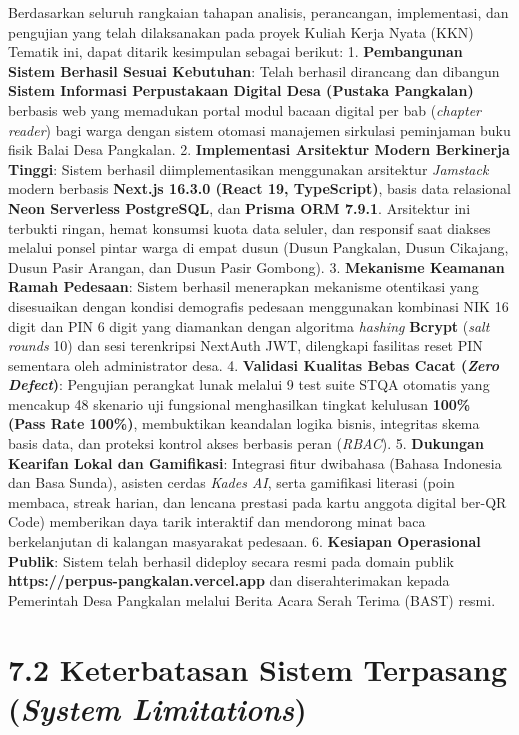 \documentclass[
  indonesian,
  12pt,
]{report}
\begin{document}
Berdasarkan seluruh rangkaian tahapan analisis, perancangan,
implementasi, dan pengujian yang telah dilaksanakan pada proyek Kuliah
Kerja Nyata (KKN) Tematik ini, dapat ditarik kesimpulan sebagai berikut:
1. \textbf{Pembangunan Sistem Berhasil Sesuai Kebutuhan}: Telah berhasil
dirancang dan dibangun \textbf{Sistem Informasi Perpustakaan Digital
Desa (Pustaka Pangkalan)} berbasis web yang memadukan portal modul
bacaan digital per bab (\emph{chapter reader}) bagi warga dengan sistem
otomasi manajemen sirkulasi peminjaman buku fisik Balai Desa Pangkalan.
2. \textbf{Implementasi Arsitektur Modern Berkinerja Tinggi}: Sistem
berhasil diimplementasikan menggunakan arsitektur \emph{Jamstack} modern
berbasis \textbf{Next.js 16.3.0 (React 19, TypeScript)}, basis data
relasional \textbf{Neon Serverless PostgreSQL}, dan \textbf{Prisma ORM
7.9.1}. Arsitektur ini terbukti ringan, hemat konsumsi kuota data
seluler, dan responsif saat diakses melalui ponsel pintar warga di empat
dusun (Dusun Pangkalan, Dusun Cikajang, Dusun Pasir Arangan, dan Dusun
Pasir Gombong). 3. \textbf{Mekanisme Keamanan Ramah Pedesaan}: Sistem
berhasil menerapkan mekanisme otentikasi yang disesuaikan dengan kondisi
demografis pedesaan menggunakan kombinasi NIK 16 digit dan PIN 6 digit
yang diamankan dengan algoritma \emph{hashing} \textbf{Bcrypt}
(\emph{salt rounds} 10) dan sesi terenkripsi NextAuth JWT, dilengkapi
fasilitas reset PIN sementara oleh administrator desa. 4.
\textbf{Validasi Kualitas Bebas Cacat (\emph{Zero Defect})}: Pengujian
perangkat lunak melalui 9 test suite STQA otomatis yang mencakup 48
skenario uji fungsional menghasilkan tingkat kelulusan \textbf{100\%
(Pass Rate 100\%)}, membuktikan keandalan logika bisnis, integritas
skema basis data, dan proteksi kontrol akses berbasis peran
(\emph{RBAC}). 5. \textbf{Dukungan Kearifan Lokal dan Gamifikasi}:
Integrasi fitur dwibahasa (Bahasa Indonesia dan Basa Sunda), asisten
cerdas \emph{Kades AI}, serta gamifikasi literasi (poin membaca, streak
harian, dan lencana prestasi pada kartu anggota digital ber-QR Code)
memberikan daya tarik interaktif dan mendorong minat baca berkelanjutan
di kalangan masyarakat pedesaan. 6. \textbf{Kesiapan Operasional
Publik}: Sistem telah berhasil dideploy secara resmi pada domain publik
\textbf{https://perpus-pangkalan.vercel.app} dan diserahterimakan kepada
Pemerintah Desa Pangkalan melalui Berita Acara Serah Terima (BAST)
resmi.

\section{\texorpdfstring{7.2 Keterbatasan Sistem Terpasang (\emph{System
Limitations})}{7.2 Keterbatasan Sistem Terpasang (System Limitations)}}\label{keterbatasan-sistem-terpasang-system-limitations}
\end{document}
